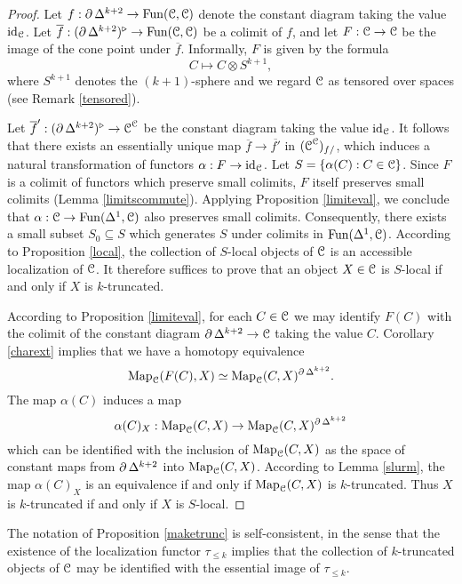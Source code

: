 \begin{proof}
Let $f: \operatorname{\partial} \Delta^{k+2} \rightarrow \operatorname{Fun}(\operatorname{\mathcal{C}},\operatorname{\mathcal{C}})$ denote the constant diagram
taking the value $\operatorname{id}_{\operatorname{\mathcal{C}}}$. Let $\overline{f}: (\operatorname{\partial} \Delta^{k+2})^{\triangleright} \rightarrow \operatorname{Fun}(\operatorname{\mathcal{C}},\operatorname{\mathcal{C}})$ be a colimit of $f$, and let $F: \operatorname{\mathcal{C}} \rightarrow \operatorname{\mathcal{C}}$ be the image of the cone point under $\overline{f}$. Informally, $F$ is given by the formula
$$ C \mapsto C \otimes S^{k+1},$$
where $S^{k+1}$ denotes the $(k+1)$-sphere and we regard $\operatorname{\mathcal{C}}$ as tensored over spaces (see Remark \ref{tensored}).

Let $\overline{f}': (\operatorname{\partial} \Delta^{k+2})^{\triangleright} \rightarrow \operatorname{\mathcal{C}}^{\operatorname{\mathcal{C}}}$ be the constant diagram taking the value $\operatorname{id}_{\operatorname{\mathcal{C}}}$. It follows that there exists an essentially unique map $\overline{f} \rightarrow \overline{f'}$ in $(\operatorname{\mathcal{C}}^{\operatorname{\mathcal{C}}})_{f/}$, which induces a natural transformation of functors $\alpha: F \rightarrow \operatorname{id}_{\operatorname{\mathcal{C}}}$. Let $S = \{ \alpha(C): C \in \operatorname{\mathcal{C}} \}$.
Since $F$ is a colimit of functors which preserve small colimits, $F$ itself preserves small colimits (Lemma \ref{limitscommute}). Applying Proposition \ref{limiteval}, we conclude that
$\alpha: \operatorname{\mathcal{C}} \rightarrow \operatorname{Fun}(\Delta^1,\operatorname{\mathcal{C}})$ also preserves small colimits. Consequently, there
exists a small subset $S_0 \subseteq S$ which generates $S$ under colimits in $\operatorname{Fun}(\Delta^1,\operatorname{\mathcal{C}})$.
According to Proposition \ref{local}, the collection of $S$-local objects of $\operatorname{\mathcal{C}}$ is an accessible localization of $\operatorname{\mathcal{C}}$. It therefore suffices to prove that an object $X \in \operatorname{\mathcal{C}}$ is $S$-local if and only if $X$ is $k$-truncated.

According to Proposition \ref{limiteval}, for each $C \in \operatorname{\mathcal{C}}$ we may identify $F(C)$
with the colimit of the constant diagram $\operatorname{\partial} \Delta^{k+2} \rightarrow \operatorname{\mathcal{C}}$ taking the value $C$. Corollary \ref{charext} implies that we have a homotopy equivalence
$$ \operatorname{{Map}}_{\operatorname{\mathcal{C}}}( F(C), X) \simeq \operatorname{{Map}}_{\operatorname{\mathcal{C}}}(C,X)^{ \operatorname{\partial} \Delta^{k+2} }.$$
The map $\alpha(C)$ induces a map
$$ \alpha(C)_{X}: \operatorname{{Map}}_{\operatorname{\mathcal{C}}}(C,X) \rightarrow \operatorname{{Map}}_{\operatorname{\mathcal{C}}}(C,X)^{ \operatorname{\partial} \Delta^{k+2} }$$ which can be identified with the inclusion of $\operatorname{{Map}}_{\operatorname{\mathcal{C}}}(C,X)$ as the space of constant maps from
$\operatorname{\partial} \Delta^{k+2}$ into $\operatorname{{Map}}_{\operatorname{\mathcal{C}}}(C,X)$. According to Lemma \ref{slurm}, the map
$\alpha(C)_{X}$ is an equivalence if and only if $\operatorname{{Map}}_{\operatorname{\mathcal{C}}}(C,X)$ is $k$-truncated.
Thus $X$ is $k$-truncated if and only if $X$ is $S$-local. 
\end{proof}

\begin{remark}
The notation of Proposition \ref{maketrunc} is self-consistent, in the sense that the existence
of the localization functor $\tau_{\leq k}$ implies that the collection of $k$-truncated objects of $\operatorname{\mathcal{C}}$ may be identified with the essential image of $\tau_{\leq k}$.
\end{remark}

